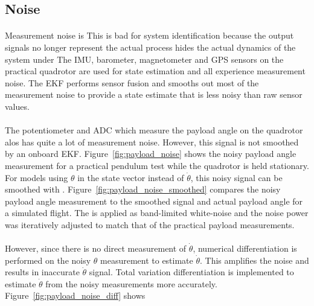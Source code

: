     \subsection{Noise}
        \paragraph{}
        Measurement noise is 
        This is bad for system identification because the output signals no longer represent the actual process
        hides the actual dynamics of the system under  
        The IMU, barometer, magnetometer and GPS sensors on the practical quadrotor are used for state estimation 
        and all experience measurement noise.
        The EKF performs sensor fusion and smooths out most of the measurement noise to provide a state estimate that is less noisy than raw sensor values.
        
        \paragraph{}
        The potentiometer and ADC which measure the payload angle on the quadrotor alos has quite a lot of measurement noise.
        However, this signal is not smoothed by an onboard EKF.
        Figure~\ref{fig:payload_noise} shows the noisy payload angle measurement for a practical pendulum test while the quadrotor is held stationary.
        For models using $\theta$ in the state vector instead of $\dot{\theta}$, 
        this noisy signal can be smoothed with .
        Figure~\ref{fig:payload_noise_smoothed} compares the noisy payload angle measurement to the smoothed signal and actual payload angle for a simulated flight.
        The is applied as band-limited white-noise and the noise power was iteratively adjusted to match that of the practical payload measurements.
        
        \paragraph{}
        However, since there is no direct measurement of $\dot{\theta}$, 
        numerical differentiation is performed on the noisy $\theta$ measurement to estimate $\dot{\theta}$. 
        This amplifies the noise and results in inaccurate $\dot{\theta}$ signal.
        Total variation differentiation is implemented to estimate $\dot{\theta}$ from the noisy measurements more accurately.
        Figure~\ref{fig:payload_noise_diff} shows
        
